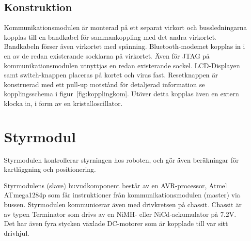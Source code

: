 \documentclass[a4paper,12pt,fleqn]{article}
\begin{document}
\subsection{Konstruktion}
Kommunikationsmodulen är monterad på ett separat virkort och bussledningarna kopplas till en bandkabel för sammankoppling med det andra virkortet.  Bandkabeln förser även virkortet med spänning.
Bluetooth-modemet kopplas in i en av de redan existerande socklarna på virkortet. Även för JTAG på kommunikationsmodulen utnyttjas en redan existerande sockel. LCD-Displayen samt switch-knappen placeras på kortet och viras fast. Resetknappen är konstruerad med ett pull-up motstånd för detaljerad information se kopplingsschema i figur~\ref{fig:kopplingkom}.
Utöver detta kopplas även en extern klocka in, i form av en kristalloscillator.


\newpage
\section{Styrmodul}
Styrmodulen kontrollerar styrningen hos roboten, och gör även beräkningar för kartläggning och positionering. 

Styrmodulens (slave) huvudkomponent består av en AVR-processor, Atmel ATmega1284p som får instruktioner från kommunikationsmodulen (master) via bussen. Styrmodulen kommunicerar även med drivkretsen på chassit. Chassit är av typen Terminator som drivs av en NiMH- eller NiCd-ackumulator på 7.2V. Det har även fyra stycken växlade DC-motorer som är kopplade till var sitt drivhjul. 
\end{document}
